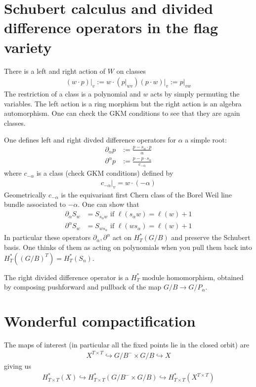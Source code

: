 \documentclass[12pt]{article}
\begin{document}
\section{Schubert calculus and divided difference operators in the flag variety}
There is a left and right action of $W$ on classes \begin{align*}
    (w\cdot p)\vert_v := w\cdot (p\vert_{wv})
    (p\cdot w)\vert_v := p\vert_{vw}
\end{align*} The restriction of a class is a polynomial and $w$ acts by simply 
permuting the variables. The left action is a ring morphism but the right action 
is an algebra automorphism. One can check the GKM conditions to see that they are again classes.

\hfill

One defines left and right divded difference operators for $\alpha$ a simple root: \begin{align*}
    \partial_\alpha p &:= \frac{p - s_\alpha\cdot p}{\alpha} \\
    \partial^\alpha p &:= \frac{p - p\cdot s_\alpha}{c_{-\alpha}}
\end{align*} where $c_{-\alpha}$ is a class (check GKM conditions) defined by \begin{align*}
    c_{-\alpha}\vert_v = w\cdot (-\alpha)
\end{align*} Geometrically $c_{-\alpha}$ is the equivariant first Chern class of the Borel Weil
line bundle associated to $-\alpha$. One can show that \begin{align*}
    \partial_\alpha S_w &= S_{s_\alpha w} \text{ if } \ell(s_\alpha w) = \ell(w) + 1 \\
    \partial^\alpha S_w &= S_{ws_\alpha} \text{ if } \ell(ws_\alpha) = \ell(w) + 1
\end{align*}
In particular these operators $\partial_\alpha, \partial^\alpha$ act on $H_T^*(G/B)$ and preserve the Schubert basis.
One thinks of them as acting on polynomials when you pull them back into $H_T^*((G/B)^T) = H_T^*(S_n)$. 

\hfill

The right divided difference operator is a $H_T^*$ module homomorphism, obtained by composing pushforward
and pullback of the map $G/B\to G/P_\alpha$.

\section{Wonderful compactification}
The maps of interest (in particular all the fixed points lie in the closed orbit) are \begin{align*}
    X^{T\times T}\hookrightarrow G/B^-\times G/B \hookrightarrow X
\end{align*} giving us \begin{align*}
    H_{T\times T}^*(X) \hookrightarrow H_{T\times T}^*(G/B^-\times G/B) \hookrightarrow H_{T\times T}^*(X^{T\times T})
\end{align*}
\end{document}

